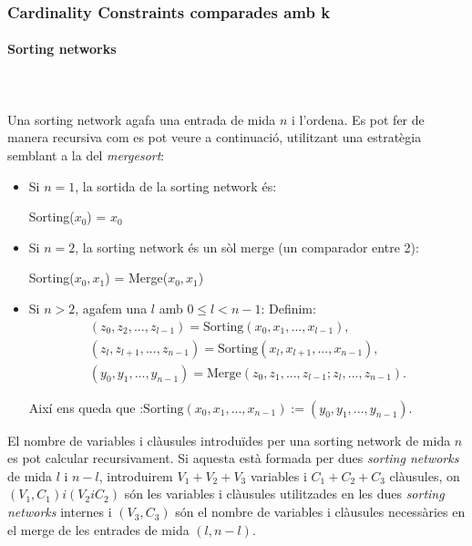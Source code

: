 \documentclass[11pt,a4paper,twoside]{report}
\begin{document}
  \subsubsection{Cardinality Constraints comparades amb k}
  \paragraph*{Sorting networks}~\\~\\
  Una sorting network agafa una entrada de mida $n$ i l'ordena. Es pot fer de manera recursiva com es pot veure a continuació, utilitzant una estratègia semblant a la del \textit{mergesort}:
  
  \begin{itemize}
    \item Si $n = 1$, la sortida de la sorting network és:\\ \begin{center} Sorting($x_0$) = $x_0$\end{center}
    \item Si $n = 2$, la sorting network és un sòl merge (un comparador entre 2):\\ \begin{center} Sorting($x_0, x_1$) = Merge($x_0, x_1$)\end{center}
    \item Si $n > 2$, agafem una $l$ amb $0 \leq l < n-1$: Definim:
    \begin{gather*}
      (z_0,z_2, . . . ,z_{l-1}) = \text{Sorting}(x_0, x_1, . . . , x_{l-1}),\\
      (z_l,z_{l+1}, . . . ,z_{n-1}) = \text{Sorting}(x_l, x_{l+1}, . . . , x_{n-1}), \\
      (y_0, y_1, . . . , y_{n-1}) = \text{Merge}(z_0,z_1, . . . , z_{l-1};z_l, . . . ,z_{n-1}).
    \end{gather*}

    Així ens queda que :$\text{Sorting}(x_0, x_1, . . . , x_{n-1}) := (y_0, y_1, . . . , y_{n-1}).$
  \end{itemize}

  El nombre de variables i clàusules introduïdes per una sorting network de mida $n$ es pot calcular recursivament. Si aquesta està formada per dues \textit{sorting networks} de mida $l$ i $n-l$, introduirem $V_1 + V_2 + V_3$ variables i $C_1 + C_2 + C_3$ clàusules, on $(V_1, C_1) i (V_2 i C_2)$ són les variables i clàusules utilitzades en les dues \textit{sorting networks} internes i $(V_3, C_3)$ són el nombre de variables i clàusules necessàries en el merge de les entrades de mida $(l, n-l)$.
\end{document}
